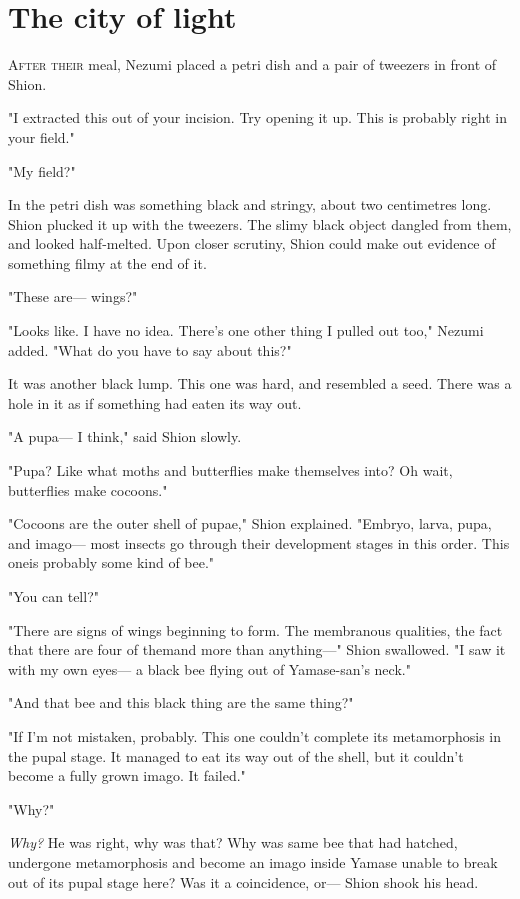 
\chapter{The city of light}

\lettrine{A}{fter their} meal, Nezumi placed a petri dish and a pair of tweezers in
front of Shion.

"I extracted this out of your incision. Try opening it up. This is
probably right in your field."

"My field?"

In the petri dish was something black and stringy, about two centimetres
long. Shion plucked it up with the tweezers. The slimy black object
dangled from them, and looked half-melted. Upon closer scrutiny, Shion
could make out evidence of something filmy at the end of it.

"These are--- wings?"

"Looks like. I have no idea. There's one other thing I pulled out too,"
Nezumi added. "What do you have to say about this?"

It was another black lump. This one was hard, and resembled a seed.
There was a hole in it as if something had eaten its way out.

"A pupa--- I think," said Shion slowly.

"Pupa? Like what moths and butterflies make themselves into? Oh wait,
butterflies make cocoons."

"Cocoons are the outer shell of pupae," Shion explained. "Embryo, larva,
pupa, and imago--- most insects go through their development stages in
this order. This one\el is probably some kind of bee."

"You can tell?"

"There are signs of wings beginning to form. The membranous qualities,
the fact that there are four of them\el and more than anything---" Shion
swallowed. "I saw it with my own eyes--- a black bee flying out of
Yamase-san's neck."

"And that bee and this black thing are the same thing?"

"If I'm not mistaken, probably. This one couldn't complete its
metamorphosis in the pupal stage. It managed to eat its way out of the
shell, but it couldn't become a fully grown imago. It failed."

"Why?"

\emph{Why?} He was right, why was that? Why was same bee that had hatched,
undergone metamorphosis and become an imago inside Yamase unable to
break out of its pupal stage here? Was it a coincidence, or--- Shion shook
his head.

